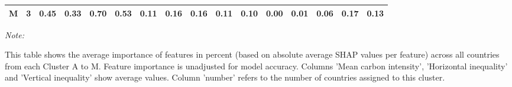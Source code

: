 \begin{table}[H]
{\begin{threeparttable}
\begin{tabular}[t]{lrrrrrrrrrrrrrrr}
M & 3 & 0.45 & 0.33 & 0.70 & 0.53 & 0.11 & 0.16 & 0.16 & 0.11 & 0.10 & 0.00 & 0.01 & 0.06 & 0.17 & 0.13\\
\bottomrule
\end{tabular}
\begin{tablenotes}
\item \textit{Note: } 
\item This table shows the average importance of features in percent (based on absolute average SHAP values per feature) across all countries from each Cluster A to M. Feature importance is unadjusted for model accuracy. Columns 'Mean carbon intensity', 'Horizontal inequality' and 'Vertical inequality' show average values. Column 'number' refers to the number of countries assigned to this cluster.
\end{tablenotes}
\end{threeparttable}}
\end{table}
